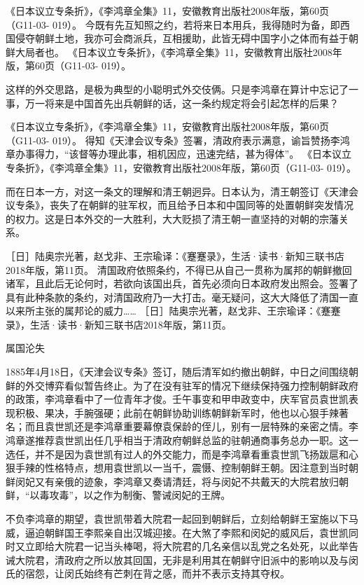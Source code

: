 \documentclass[12pt,UTF8]{ctexbook}
\begin{document}
《日本议立专条折》，《李鸿章全集》11，安徽教育出版社2008年版，第60页（G11-03- 019）。
今既有先互知照之约，若将来日本用兵，我得随时为备，即西国侵夺朝鲜土地，我亦可会商派兵，互相援助，此皆无碍中国字小之体而有益于朝鲜大局者也。 《日本议立专条折》，《李鸿章全集》11，安徽教育出版社2008年版，第60页（G11-03- 019）。

这样的外交思路，是极为典型的小聪明式外交伎俩。只是李鸿章在算计中忘记了一事，万一将来是中国首先出兵朝鲜的话，这一条约规定将会引起怎样的后果？

《日本议立专条折》，《李鸿章全集》11，安徽教育出版社2008年版，第60页（G11-03- 019）。
得知《天津会议专条》签署，清政府表示满意，谕旨赞扬李鸿章办事得力，“该督等办理此事，相机因应，迅速完结，甚为得体”。 《日本议立专条折》，《李鸿章全集》11，安徽教育出版社2008年版，第60页（G11-03- 019）。

而在日本一方，对这一条文的理解和清王朝迥异。日本认为，清王朝签订《天津会议专条》，丧失了在朝鲜的驻军权，而且给予日本和中国同等的处置朝鲜突发情况的权力。这是日本外交的一大胜利，大大贬损了清王朝一直坚持的对朝的宗藩关系。

［日］陆奥宗光著，赵戈非、王宗瑜译：《蹇蹇录》，生活·读书·新知三联书店2018年版，第11页。
清国政府依照条约，不得已从自己一贯称为属邦的朝鲜撤回诸军，且此后无论何时，若欲向该国出兵，首先必须向日本政府发出照会。签署了具有此种条款的条约，对清国政府乃一大打击。毫无疑问，这大大降低了清国一直以来所主张的属邦论的威力…… ［日］陆奥宗光著，赵戈非、王宗瑜译：《蹇蹇录》，生活·读书·新知三联书店2018年版，第11页。

属国沦失

1885年4月18日，《天津会议专条》签订，随后清军如约撤出朝鲜，中日之间围绕朝鲜的外交博弈看似暂告终止。为了在没有驻军的情况下继续保持强力控制朝鲜政府的政策，李鸿章看中了一位青年才俊。壬午事变和甲申政变中，庆军官员袁世凯表现积极、果决，手腕强硬；此前在朝鲜协助训练朝鲜新军时，他也以心狠手辣著名；而且袁世凯还是李鸿章重要幕僚袁保龄的侄儿，别有一层特殊的亲密之情。李鸿章遂推荐袁世凯出任几乎相当于清政府朝鲜总监的驻朝通商事务总办一职。这一选任，并不是因为袁世凯有过人的外交能力，而是李鸿章看重袁世凯飞扬跋扈和心狠手辣的性格特点，想用袁世凯以一当千，震慑、控制朝鲜王朝。因注意到当时朝鲜闵妃又有亲俄的迹象，李鸿章又奏请清廷，将与闵妃不共戴天的大院君放归朝鲜，“以毒攻毒”，以之作为制衡、警诫闵妃的王牌。

不负李鸿章的期望，袁世凯带着大院君一起回到朝鲜后，立刻给朝鲜王室施以下马威，逼迫朝鲜国王李熙亲自出汉城迎接。在大煞了李熙和闵妃的威风后，袁世凯同时又立即给大院君一记当头棒喝，将大院君的几名亲信以乱党之名处死，以此举告诫大院君，清政府之所以放其回国，无非是利用其在朝鲜守旧派中的影响以及与闵氏的宿怨，让闵氏始终有芒刺在背之感，而并不表示支持其夺权。
\end{document}
